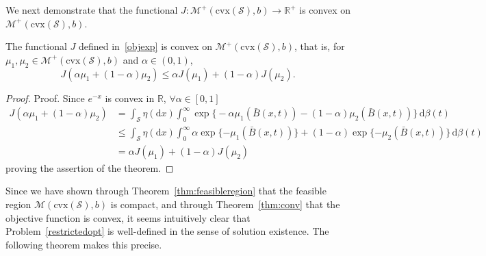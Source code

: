 \documentclass[stsy,sglanonrev]{informs4}
\newcommand{\death}{{\beta}}
\begin{document}
We next demonstrate that the functional $J: \mathcal{M}^+(\mbox{cvx}(\mathcal{S}),b) \to \mathbb{R}^+$ is convex on $\mathcal{M}^+(\mbox{cvx}(\mathcal{S}),b)$. 
\begin{theorem}\label{thm:conv} The functional $J$ defined in~\eqref{objexp} is convex on $\mathcal{M}^+(\mathrm{cvx}(\mathcal{S}),b)$, that is, for $\mu_1, \mu_2 \in \mathcal{M}^+(\mbox{cvx}(\mathcal{S}),b)$ and $\alpha \in (0,1)$, $$J(\alpha \mu_1 + (1-\alpha)\mu_2) \leq \alpha J(\mu_1) + (1-\alpha) J(\mu_2).$$ \end{theorem} \begin{proof}{Proof.} Since $e^{-x}$ is convex in $\mathbb{R}$, $\forall \alpha \in [0,1]$
\begin{align} 
    J(\alpha \mu_1 + (1-\alpha)\mu_2)  &= \int_{\mathcal{S}} \eta(\mbox{d}x) \int_0^\infty \exp\Big\{-\alpha \mu_1(\bar{B}(x,t)) - (1-\alpha)\mu_2(\bar{B}(x,t))\Big\} \, \mbox{d}\death(t) \nonumber\\
    & \leq \int_{\mathcal{S}} \eta(\mbox{d}x) \int_0^\infty \alpha \exp \{- \mu_1(\bar{B}(x,t))\} +  (1-\alpha)\exp \{- \mu_2(\bar{B}(x,t))\} \, \mbox{d}\death(t) \nonumber\\ & = \alpha J(\mu_1) + (1-\alpha) J(\mu_2) \nonumber
\end{align} proving the assertion of the theorem. \hfill \Halmos
\end{proof}  

Since we have shown through Theorem~\ref{thm:feasibleregion} that the feasible region $\mathcal{M}(\mbox{cvx}(\mathcal{S}),b)$ is compact, and through Theorem~\ref{thm:conv} that the objective function is convex, it seems intuitively clear that Problem~\eqref{restrictedopt} is well-defined in the sense of solution existence. The following theorem makes this precise.
\end{document}
